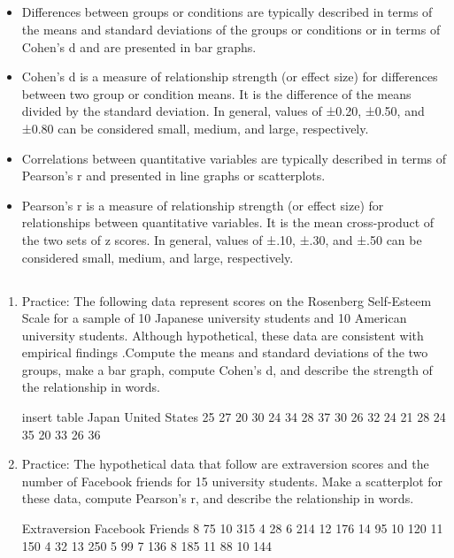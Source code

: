 \subsection{}

\begin{fullwidth}
\begin{itemize}
\item Differences between groups or conditions are typically described in terms of the means and standard deviations of the groups or conditions or in terms of Cohen's d and are presented in bar graphs.

\item Cohen's d is a measure of relationship strength (or effect size) for differences between two group or condition means. It is the difference of the means divided by the standard deviation. In general, values of ±0.20, ±0.50, and ±0.80 can be considered small, medium, and large, respectively.

\item Correlations between quantitative variables are typically described in terms of Pearson's r and presented in line graphs or scatterplots.

\item Pearson's r is a measure of relationship strength (or effect size) for relationships between quantitative variables. It is the mean cross-product of the two sets of z scores. In general, values of ±.10, ±.30, and ±.50 can be considered small, medium, and large, respectively.

\end{itemize}
\end{fullwidth}


\subsection{}
\begin{fullwidth}
\begin{enumerate}
\item Practice: The following data represent scores on the Rosenberg Self-Esteem Scale for a sample of 10 Japanese university students and 10 American university students. Although hypothetical, these data are consistent with empirical findings \citep{schmitt_simultaneous_2005}.Compute the means and standard deviations of the two groups, make a bar graph, compute Cohen's d, and describe the strength of the relationship in words.
  

insert table
Japan
United States
25
27
20
30
24
34
28
37
30
26
32
24
21
28
24
35
20
33
26
36
              

\item Practice: The hypothetical data that follow are extraversion scores and the number of Facebook friends for 15 university students. Make a scatterplot for these data, compute Pearson's r, and describe the relationship in words.


 Extraversion
Facebook Friends
8
75
10
315
4
28
6
214
12
176
14
95
10
120
11
150
4
32
13
250
5
99
7
136
8
185
11
88
10
144
   
\end{enumerate}
\end{fullwidth}  


